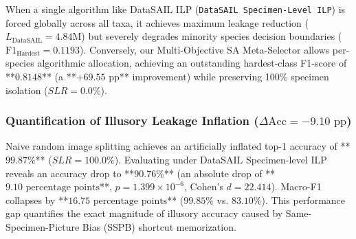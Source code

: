 When a single algorithm like DataSAIL ILP (\texttt{DataSAIL Specimen-Level ILP}) is forced globally across all taxa, it achieves maximum leakage reduction ($L_{\text{DataSAIL}} = 4.84\text{M}$) but severely degrades minority species decision boundaries ($\mathrm{F1}_{\text{Hardest}} = 0.1193$). Conversely, our Multi-Objective SA Meta-Selector allows per-species algorithmic allocation, achieving an outstanding hardest-class F1-score of **$0.8148$** (a **$+69.55\text{ pp}$** improvement) while preserving 100\% specimen isolation ($SLR = 0.0\%$).

\subsubsection{Quantification of Illusory Leakage Inflation ($\Delta \text{Acc} = -9.10\text{ pp}$)}
Naive random image splitting achieves an artificially inflated top-1 accuracy of **$99.87\%$** ($SLR = 100.0\%$). Evaluating under DataSAIL Specimen-level ILP reveals an accuracy drop to **$90.76\%$** (an absolute drop of **$9.10\text{ percentage points}$**, $p = 1.399 \times 10^{-6}$, Cohen's $d = 22.414$). Macro-F1 collapses by **$16.75\text{ percentage points}$** ($99.85\%$ vs. $83.10\%$). This performance gap quantifies the exact magnitude of illusory accuracy caused by Same-Specimen-Picture Bias (SSPB) shortcut memorization.
